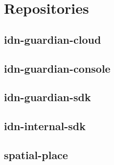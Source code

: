 \chapter{Repositories}
\label{appendix6-repositories}

\section*{idn-guardian-cloud}

\section*{idn-guardian-console}

\section*{idn-guardian-sdk}

\section*{idn-internal-sdk}

\section*{spatial-place}
